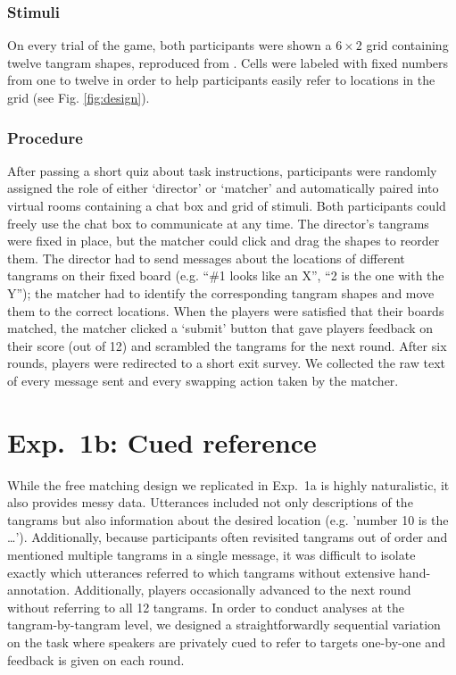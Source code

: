 \documentclass[alpha-refs]{wiley-article}
\begin{document}
\subsubsection{Stimuli}\label{stimuli}

On every trial of the game, both participants were shown a \(6 \times 2\) grid containing twelve tangram shapes, reproduced from \cite{ClarkWilkesGibbs86_ReferringCollaborative}. 
Cells were labeled with fixed numbers from one to twelve in order to help participants easily refer to locations in the grid (see Fig. \ref{fig:design}).

\subsubsection{Procedure}\label{procedure}

After passing a short quiz about task instructions, participants were
randomly assigned the role of either `director' or `matcher' and
automatically paired into virtual rooms containing a chat box and grid
of stimuli. Both participants could freely use the chat box to
communicate at any time. The director's tangrams were fixed in place,
but the matcher could click and drag the shapes to reorder them. The
director had to send messages about the locations of different tangrams
on their fixed board (e.g. ``\#1 looks like an X'', ``2 is the one with
the Y''); the matcher had to identify the corresponding tangram shapes
and move them to the correct locations. When the players were satisfied
that their boards matched, the matcher clicked a `submit' button that
gave players feedback on their score (out of 12) and scrambled the
tangrams for the next round. After six rounds, players were redirected
to a short exit survey. We collected the raw text of every message sent
and every swapping action taken by the matcher.

\section{Exp.~1b: Cued reference}

While the free matching design we replicated in Exp.~1a is highly naturalistic, it also provides messy data. Utterances included not only descriptions of the tangrams but also information about the desired location (e.g. 'number 10 is the \dots'). Additionally, because participants often revisited tangrams out of order and mentioned multiple tangrams in a single message, it was difficult to isolate exactly which utterances referred to which tangrams without extensive hand-annotation. Additionally, players occasionally advanced to the next round without referring to all 12 tangrams. In order to conduct analyses at the tangram-by-tangram level, we designed a straightforwardly sequential variation on the task where speakers are privately cued to refer to targets one-by-one and feedback is given on each round. 
\end{document}
